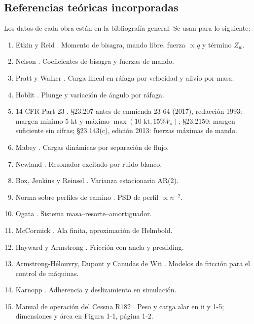 \subsection{Referencias teóricas incorporadas}
Los datos de cada obra están en la bibliografía general. Se usan para lo siguiente:
\begin{enumerate}
\item Etkin y Reid \cite{etkin1996}. Momento de bisagra, mando libre, fuerza $\propto q$ y término $Z_w$.
\item Nelson \cite{nelson1998}. Coeficientes de bisagra y fuerzas de mando.
\item Pratt y Walker \cite{pratt1954}. Carga lineal en ráfaga por velocidad y alivio por masa.
\item Hoblit \cite{hoblit1988}. Plunge y variación de ángulo por ráfaga.
\item 14 CFR Part 23 \cite{cfr23}. §23.207 antes de enmienda 23-64 (2017), redacción 1993: margen mínimo 5 kt y máximo $\max(10\text{ kt},15\%V_s)$; §23.2150: margen suficiente sin cifras; §23.143(c), edición 2013: fuerzas máximas de mando.
\item Mabey \cite{mabey1988}. Cargas dinámicas por separación de flujo.
\item Newland \cite{newland1993}. Resonador excitado por ruido blanco.
\item Box, Jenkins y Reinsel \cite{box}. Varianza estacionaria AR(2).
\item Norma sobre perfiles de camino \cite{iso8608}. PSD de perfil $\propto n^{-2}$.
\item Ogata \cite{ogata}. Sistema masa--resorte--amortiguador.
\item McCormick \cite{mccormick1995}. Ala finita, aproximación de Helmbold.
\item Hayward y Armstrong \cite{hayward2000}. Fricción con ancla y presliding.
\item Armstrong-Hélouvry, Dupont y Canudas de Wit \cite{armstrong1994}. Modelos de fricción para el control de máquinas.
\item Karnopp \cite{karnopp1985}. Adherencia y deslizamiento en simulación.
\item Manual de operación del Cessna R182 \cite{poh182}. Peso y carga alar en ii y 1-5; dimensiones y área en Figura 1-1, página 1-2.
\end{enumerate}


